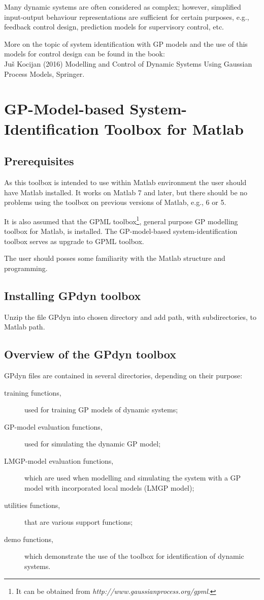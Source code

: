 \documentclass[12pt,twoside]{article}
\begin{document}
Many dynamic systems are often considered as complex; however, simplified
input-output behaviour representations are sufficient for certain purposes,
e.g., feedback control design, prediction models for supervisory control,
etc.

More on the topic of system identification with GP models and the use of this models for control design can be found in the book:\\
Ju\v s Kocijan (2016) Modelling and Control of Dynamic Systems Using Gaussian
Process Models, Springer.


\section{GP-Model-based System-Identification Toolbox for Matlab}

\subsection{Prerequisites}

As this toolbox is intended to use within Matlab environment the
user should have Matlab installed. It works on Matlab 7 and later,
but there should be no problems using the toolbox on previous
versions of Matlab, e.g., 6 or 5.

It is also assumed that the GPML toolbox\footnote{It can be
obtained from \emph{http://www.gaussianprocess.org/gpml}.},
general purpose GP modelling toolbox for Matlab, is installed. The GP-model-based system-identification toolbox serves as upgrade to GPML toolbox.

The user should posses some familiarity with the Matlab
structure and programming.

\subsection{Installing GPdyn toolbox}

Unzip the file GPdyn into chosen directory and add path, with
subdirectories, to Matlab path.


\subsection{Overview of the GPdyn toolbox}

GPdyn files are contained in several directories, depending on
their purpose:
 \begin{description}
 \item [training functions,] used for training GP models of dynamic systems;
 \item [GP-model evaluation functions,] used for simulating the dynamic
 GP model;
 \item [LMGP-model evaluation functions,] which are used when modelling and simulating the system with a GP model with incorporated local models (LMGP model);
 \item [utilities functions,] that are various support functions;
 \item [demo functions,] which demonstrate the use of the toolbox
 for identification of dynamic systems.
 \end{description}
\end{document}
